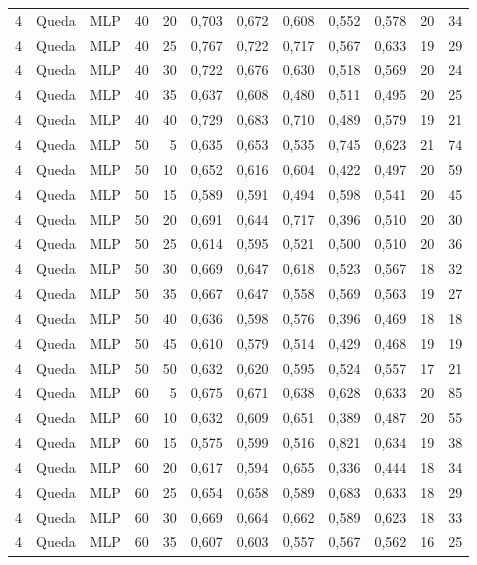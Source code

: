 \begin{longtable}{@{}rllrrrrrrrrr@{}}
4 & Queda & MLP & 40 & 20 & 0,703 & 0,672 & 0,608 & 0,552 & 0,578 & 20 & 34 \\
4 & Queda & MLP & 40 & 25 & 0,767 & 0,722 & 0,717 & 0,567 & 0,633 & 19 & 29 \\
4 & Queda & MLP & 40 & 30 & 0,722 & 0,676 & 0,630 & 0,518 & 0,569 & 20 & 24 \\
4 & Queda & MLP & 40 & 35 & 0,637 & 0,608 & 0,480 & 0,511 & 0,495 & 20 & 25 \\
4 & Queda & MLP & 40 & 40 & 0,729 & 0,683 & 0,710 & 0,489 & 0,579 & 19 & 21 \\
4 & Queda & MLP & 50 & 5 & 0,635 & 0,653 & 0,535 & 0,745 & 0,623 & 21 & 74 \\
4 & Queda & MLP & 50 & 10 & 0,652 & 0,616 & 0,604 & 0,422 & 0,497 & 20 & 59 \\
4 & Queda & MLP & 50 & 15 & 0,589 & 0,591 & 0,494 & 0,598 & 0,541 & 20 & 45 \\
4 & Queda & MLP & 50 & 20 & 0,691 & 0,644 & 0,717 & 0,396 & 0,510 & 20 & 30 \\
4 & Queda & MLP & 50 & 25 & 0,614 & 0,595 & 0,521 & 0,500 & 0,510 & 20 & 36 \\
4 & Queda & MLP & 50 & 30 & 0,669 & 0,647 & 0,618 & 0,523 & 0,567 & 18 & 32 \\
4 & Queda & MLP & 50 & 35 & 0,667 & 0,647 & 0,558 & 0,569 & 0,563 & 19 & 27 \\
4 & Queda & MLP & 50 & 40 & 0,636 & 0,598 & 0,576 & 0,396 & 0,469 & 18 & 18 \\
4 & Queda & MLP & 50 & 45 & 0,610 & 0,579 & 0,514 & 0,429 & 0,468 & 19 & 19 \\
4 & Queda & MLP & 50 & 50 & 0,632 & 0,620 & 0,595 & 0,524 & 0,557 & 17 & 21 \\
4 & Queda & MLP & 60 & 5 & 0,675 & 0,671 & 0,638 & 0,628 & 0,633 & 20 & 85 \\
4 & Queda & MLP & 60 & 10 & 0,632 & 0,609 & 0,651 & 0,389 & 0,487 & 20 & 55 \\
4 & Queda & MLP & 60 & 15 & 0,575 & 0,599 & 0,516 & 0,821 & 0,634 & 19 & 38 \\
4 & Queda & MLP & 60 & 20 & 0,617 & 0,594 & 0,655 & 0,336 & 0,444 & 18 & 34 \\
4 & Queda & MLP & 60 & 25 & 0,654 & 0,658 & 0,589 & 0,683 & 0,633 & 18 & 29 \\
4 & Queda & MLP & 60 & 30 & 0,669 & 0,664 & 0,662 & 0,589 & 0,623 & 18 & 33 \\
4 & Queda & MLP & 60 & 35 & 0,607 & 0,603 & 0,557 & 0,567 & 0,562 & 16 & 25 \\

\end{longtable}
